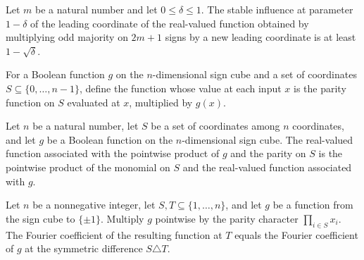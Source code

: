 \begin{theorem}
\label{FABL.one_sub_sqrt_le_stableInfluence_leadingCoordinateTimes_majority_odd}
\leanok
{}
Let $m$ be a natural number and let $0\leq\delta\leq1$. The stable influence at
parameter $1-\delta$ of the leading coordinate of the real-valued function obtained by
multiplying odd majority on $2m+1$ signs by a new leading coordinate is at least
$1-\sqrt{\delta}$.
\end{theorem}

\begin{definition}
\label{FABL.parityTimes}
\leanok
{}
For a Boolean function $g$ on the $n$-dimensional sign cube and a set of coordinates
$S\subseteq\{0,\ldots,n-1\}$, define the function whose value at each input $x$ is the
parity function on $S$ evaluated at $x$, multiplied by $g(x)$.
\end{definition}

\begin{theorem}
\label{FABL.parityTimes_toReal}
\leanok
{}
Let $n$ be a natural number, let $S$ be a set of coordinates among $n$ coordinates, and
let $g$ be a Boolean function on the $n$-dimensional sign cube. The real-valued function
associated with the pointwise product of $g$ and the parity on $S$ is the pointwise
product of the monomial on $S$ and the real-valued function associated with $g$.
\end{theorem}

\begin{theorem}
\label{FABL.fourierCoeff_parityTimes}
\leanok
{}
Let $n$ be a nonnegative integer, let $S,T\subseteq\{1,\ldots,n\}$, and let $g$ be a
function from the sign cube to $\{\pm1\}$. Multiply $g$ pointwise by the parity
character $\prod_{i\in S}x_i$. The Fourier coefficient of the resulting function at
$T$ equals the Fourier coefficient of $g$ at the symmetric difference $S\triangle T$.
\end{theorem}

